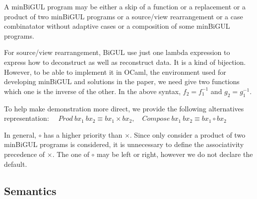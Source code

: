 A minBiGUL program may be either a skip of a function or a replacement or a product of two minBiGUL programs or a source/view rearrangement or a case combinatator without adaptive cases or a composition of some minBiGUL programs.

For source/view rearrangement, BiGUL use just one lambda expression to express how to deconstruct as well as reconstruct data. It is a kind of bijection. However, to be able to implement it in OCaml, the environment used for developing minBiGUL and solutions in the paper, we need give two functions which one is the inverse of the other. In the above syntax, $f_2 = f_1^{-1}$ and $g_2 = g_1^{-1}$.

To help make demonstration more direct, we provide the following alternatives representation: 
    $\quad Prod \ bx_1 \ bx_2 \equiv bx_1 \times bx_2,
    \quad Compose \ bx_1 \ bx_2 \equiv bx_1 \circ bx_2$

In general, $\circ$ has a higher priority than $\times$. Since only consider a product of two minBiGUL programs is considered, it is unnecessary to define the associativity precedence of $\times$. The one of $\circ$ may be left or right, however we do not declare the default.

\subsection{Semantics}

